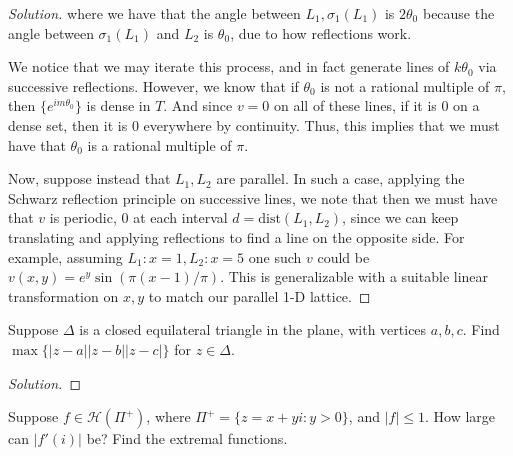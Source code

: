 \documentclass[10pt]{article}
\newenvironment{problem}[2][]{\begin{trivlist}
\item[\hskip \labelsep {\bfseries #1}\hskip \labelsep {\bfseries #2.}]}{\end{trivlist}}
\begin{document}
\begin{proof}[Solution]
where we have that the angle between $L_1, \sigma_1(L_1)$ is $2 \theta_0$ because the angle between $\sigma_1(L_1)$ and $L_2$ is $\theta_0$, due to how reflections work.

We notice that we may iterate this process, and in fact generate lines of $k\theta_0$ via successive reflections. However, we know that if $\theta_0$ is not a rational multiple of $\pi$, then $\{ e^{im\theta_0} \}$ is dense in $T$. And since $v = 0 $ on all of these lines, if it is $0$ on a dense set, then it is $0$ everywhere by continuity. Thus, this implies that we must have that $\theta_0$ is a rational multiple of $\pi$.

Now, suppose instead that $L_1, L_2$ are parallel. In such a case, applying the Schwarz reflection principle on successive lines, we note that then we must have that $v$ is periodic, $0$ at each interval $d = \text{dist}(L_1, L_2)$, since we can keep translating and applying reflections to find a line on the opposite side. For example, assuming $L_1: x = 1, L_2: x = 5$ one such $v$ could be $v(x,y) = e^{y} \sin(\pi(x-1)/\pi)$. This is generalizable with a suitable linear transformation on $x,y$ to match our parallel 1-D lattice.

\end{proof}

\begin{problem}{Question 2}

Suppose $\Delta$ is a closed equilateral triangle in the plane, with vertices $a,b,c$. Find $\max\{ |z-a||z-b||z-c| \}$ for $z \in \Delta$. 

\end{problem}

\begin{proof}[Solution]

\end{proof}

\begin{problem}{Question 3}

Suppose $f \in \mathcal{H}(\Pi^+)$, where $\Pi^+= \{ z = x + yi : y > 0 \}$, and $|f| \leq 1$. How large can $|f'(i)|$ be? Find the extremal functions.

\end{problem}
\end{document}
